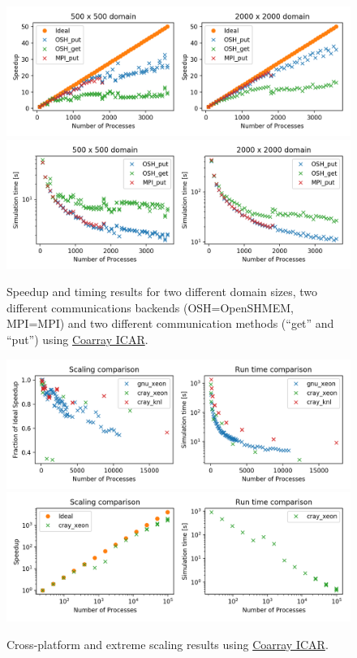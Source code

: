 \begin{figure}
  \includegraphics[width=\textwidth]{figures/fig1_speedup.png}
  \includegraphics[width=\textwidth]{figures/fig2_timing.png}
  \caption{Speedup and timing results for two different domain sizes, two different communications backends (OSH=OpenSHMEM, MPI=MPI) and two different communication methods (``get'' and ``put'') using \href{https://github.com/gutmann/coarray_icar}{Coarray ICAR}.\label{fig1-2}}
\end{figure}

\begin{figure}
  \includegraphics[width=\textwidth]{figures/fig3_cross_platform.png}
  \includegraphics[width=\textwidth]{figures/fig4_extreme_scaling.png}
   \caption{Cross-platform and extreme scaling results using \href{https://github.com/gutmann/coarray_icar}{Coarray ICAR}.\label{fig3-4}}
\end{figure}

